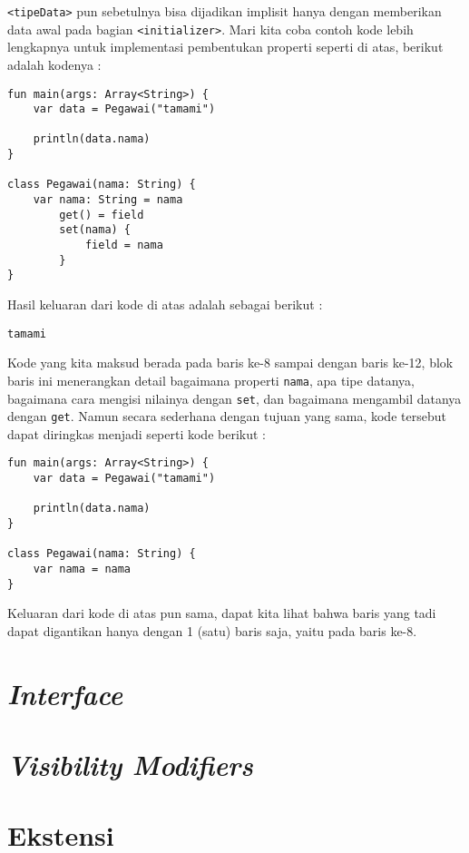  \texttt{<tipeData>} pun sebetulnya bisa dijadikan implisit hanya dengan memberikan data awal pada bagian \texttt{<initializer>}. Mari kita coba contoh kode lebih lengkapnya untuk implementasi pembentukan properti seperti di atas, berikut adalah kodenya :

\begin{lstlisting}
fun main(args: Array<String>) {
	var data = Pegawai("tamami")
	
	println(data.nama)
}

class Pegawai(nama: String) {
	var nama: String = nama	
		get() = field
		set(nama) {
			field = nama
		}
}
\end{lstlisting}

Hasil keluaran dari kode di atas adalah sebagai berikut :

\begin{lstlisting}
tamami
\end{lstlisting}

Kode yang kita maksud berada pada baris ke-8 sampai dengan baris ke-12, blok baris ini menerangkan detail bagaimana properti \texttt{nama}, apa tipe datanya, bagaimana cara mengisi nilainya dengan \texttt{set}, dan bagaimana mengambil datanya dengan \texttt{get}. Namun secara sederhana dengan tujuan yang sama, kode tersebut dapat diringkas menjadi seperti kode berikut :

\begin{lstlisting}
fun main(args: Array<String>) {
	var data = Pegawai("tamami")
	
	println(data.nama)
}

class Pegawai(nama: String) {
	var nama = nama
}
\end{lstlisting}

Keluaran dari kode di atas pun sama, dapat kita lihat bahwa baris yang tadi dapat digantikan hanya dengan 1 (satu) baris saja, yaitu pada baris ke-8.

\section{\textit{Interface}}

\section{\textit{Visibility Modifiers}}

\section{Ekstensi}

